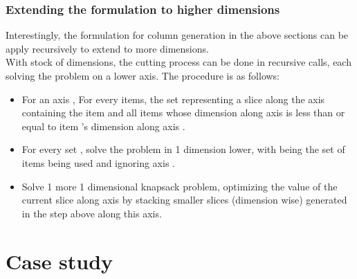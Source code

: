 \documentclass[a4paper]{article}
\begin{document}
    \subsubsection{Extending the formulation to higher dimensions}
    \noindent Interestingly, the formulation for column generation in the above sections can be apply recursively to extend to more dimensions.
    \vspace{0.2cm}\\
    With stock of  dimensions, the cutting process can be done in  recursive calls, each solving the problem on a lower axis. The procedure is as follows:
    \begin{itemize}
        \item For an axis , For every items, the set  representing a slice along the axis  containing the item  and all items whose dimension along axis  is less than or equal to item 's dimension along axis .
        \item For every set , solve the problem in 1 dimension lower, with  being the set of items being used and ignoring axis .
        \item Solve 1 more 1 dimensional knapsack problem, optimizing the value of the current slice along axis  by stacking smaller slices (dimension wise) generated in the step above along this axis.
    \end{itemize} 

    \pagebreak
    \section{Case study}
\end{document}
